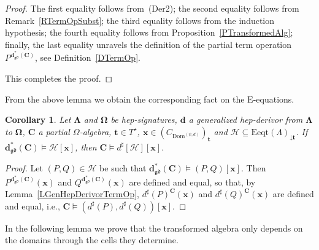 \documentclass[a4paper, reqno]{amsbook}
\newcommand{\vs}[1]{\mathbin{\downarrow}#1}
\newcommand{\sig}[1]{\mathbf{#1}}             %
\newcommand{\Dom}{\mathrm{Dom}}
\newcommand{\gd}{\mathfrak{gd}}              %
\theoremstyle{plain}
\newtheorem{corollary}[theorem]{Corollary}
\theoremstyle{definition}
\begin{document}
\begin{proof}
The first equality follows from~(Der2); the second equality follows from Remark~\ref{RTermOpSubst}; the third equality follows from the induction hypothesis; the fourth equality follows from Proposition~\ref{PTransformedAlg}; finally, the last equality unravels the definition of the partial term operation $P^{\mathbf{d}^{\ast}_{\gd}(\mathbf{C})}$, see Definition~\ref{DTermOp}.

This completes the proof.
\end{proof}

From the above lemma we obtain the corresponding fact on the $\mathrm{E}$-equations.

\begin{corollary}\label{CGenHepDerivorEq}
Let $\sig{\Lambda}$ and $\sig{\Omega}$ be hep-signatures, $\mathbf{d}$ a generalized hep-derivor from $\sig{\Lambda}$ to $\sig{\Omega}$, $\mathbf{C}$ a partial $\Omega$-algebra, $\mathbf{t}\in T^{\star}$, $\mathbf{x}\in(C_{\Dom^{(\psi,d)}})_{\mathbf{t}}$ and $\mathcal{H}\subseteq\mathrm{Eeqt}(\Lambda)_{\vs{\mathbf{t}}}$.
If $\mathbf{d}^{\ast}_{\gd}(\mathbf{C})\models\mathcal{H}[\mathbf{x}]$, then $\mathbf{C}\models d^{\sharp}[\mathcal{H}][\mathbf{x}]$.
\end{corollary}
\begin{proof}
Let $(P,Q)\in\mathcal{H}$ be such that $\mathbf{d}^{\ast}_{\gd}(\mathbf{C})\models(P,Q)[\mathbf{x}]$.
Then $P^{\mathbf{d}^{\ast}_{\gd}(\mathbf{C})}(\mathbf{x})$ and $Q^{\mathbf{d}^{\ast}_{\gd}(\mathbf{C})}(\mathbf{x})$ are defined and equal, so that, by Lemma~\ref{LGenHepDerivorTermOp}, $d^{\sharp}(P)^{\mathbf{C}}(\mathbf{x})$ and $d^{\sharp}(Q)^{\mathbf{C}}(\mathbf{x})$ are defined and equal, i.e., $\mathbf{C}\models(d^{\sharp}(P),d^{\sharp}(Q))[\mathbf{x}]$.
\end{proof}

In the following lemma we prove that the transformed algebra only depends on the domains through the cells they determine.
\end{document}
